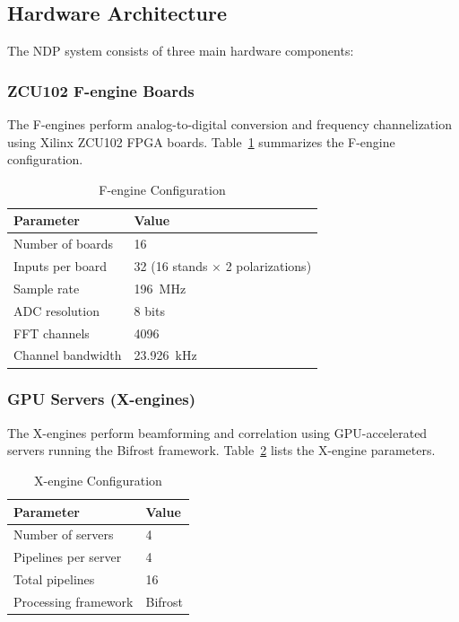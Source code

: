 \subsection{Hardware Architecture}

The NDP system consists of three main hardware components:

\subsubsection{ZCU102 F-engine Boards}

The F-engines perform analog-to-digital conversion and frequency channelization using Xilinx ZCU102 FPGA boards.  Table~\ref{tab:fengine-config} summarizes the F-engine configuration.

\begin{table}[htbp]
    \centering
    \caption{F-engine Configuration}
    \label{tab:fengine-config}
    \begin{tabular}{ll}
        \toprule
        \textbf{Parameter} & \textbf{Value} \\
        \midrule
        Number of boards & 16 \\
        Inputs per board & 32 (16 stands $\times$ 2 polarizations) \\
        Sample rate & 196~MHz \\
        ADC resolution & 8 bits \\
        FFT channels & 4096 \\
        Channel bandwidth & 23.926~kHz \\
        \bottomrule
    \end{tabular}
\end{table}

\subsubsection{GPU Servers (X-engines)}

The X-engines perform beamforming and correlation using GPU-accelerated servers running the Bifrost framework.  Table~\ref{tab:xengine-config} lists the X-engine parameters.

\begin{table}[htbp]
    \centering
    \caption{X-engine Configuration}
    \label{tab:xengine-config}
    \begin{tabular}{ll}
        \toprule
        \textbf{Parameter} & \textbf{Value} \\
        \midrule
        Number of servers & 4 \\
        Pipelines per server & 4 \\
        Total pipelines & 16 \\
        Processing framework & Bifrost \\
        \bottomrule
    \end{tabular}
\end{table}


